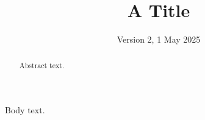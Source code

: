 \documentclass{asmejour}
\begin{document}
\title{A Title}
\begin{abstract}
Abstract text.
\end{abstract}
\date{Version 2, 1 May 2025}
\maketitle
Body text.
\end{document}
